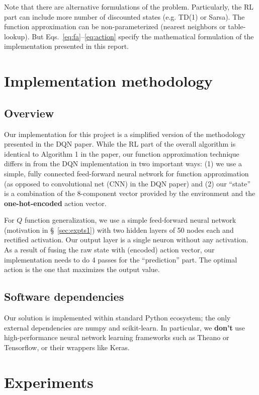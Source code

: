 \documentclass[conference]{IEEEtran}
\begin{document}
Note that there are alternative formulations of the problem. Particularly, the RL part can include more number of discounted states (e.g. TD(1) or Sarsa). The function approximation can be non-parameterized (nearest neighbors or table-lookup). But Eqs.~\eqref{eq:fa}--\eqref{eq:action} specify the mathematical formulation of the implementation presented in this report.   
\section{Implementation methodology}
\subsection{Overview}
Our implementation for this project is a simplified version of the methodology presented in the DQN paper\cite{dqn}. While the RL part of the overall algorithm is identical to Algorithm 1 in the paper, our function approximation technique differs in from the DQN implementation in two important ways: (1) we use a simple, fully connected feed-forward neural network for function approximation (as opposed to convolutional net (CNN) in the DQN paper) and (2) our ``state'' is a combination of the 8-component vector provided by the environment and the {\bf one-hot-encoded} action vector. 

For $Q$ function generalization, we use a simple feed-forward neural network (motivation in \S~\ref{sec:expts1}) with two hidden layers of 50 nodes each and rectified activation. Our output layer is a single neuron without any activation. As a result of fusing the raw state with (encoded) action vector, our implementation needs to do 4 passes for the ``prediction'' part. The optimal action is the one that maximizes the output value.
\subsection{Software dependencies}
Our solution is implemented within standard Python ecosystem; the only external dependencies are numpy and scikit-learn. In particular, we {\bf don't} use high-performance neural network learning frameworks such as Theano or Tensorflow, or their wrappers like Keras. 
\section{Experiments}
\end{document}
